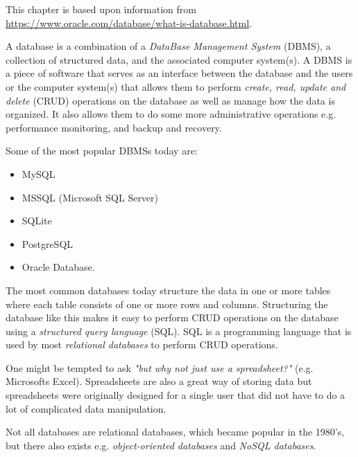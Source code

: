 This chapter is based upon information from \url{https://www.oracle.com/database/what-is-database.html}.

A database is a combination of a \textit{DataBase Management System} (DBMS), a collection of structured data, and the associated computer system(s).
A DBMS is a piece of software that serves as an interface between the database and the users or the computer system(s) that allows them to perform \textit{create, read, update and delete} (CRUD) operations on the database as well as manage how the data is organized. It also allows them to do some more administrative operations e.g. performance monitoring, and backup and recovery.

Some of the most popular DBMSs today are: 
\begin{itemize}
        \item MySQL
        \item MSSQL (Microsoft SQL Server)
        \item SQLite
        \item PostgreSQL
        \item Oracle Database.
\end{itemize}

The most common databases today structure the data in one or more tables where each table consists of one or more rows and columns. Structuring the database like this makes it easy to perform CRUD operations on the database using a \textit{structured query language} (SQL). SQL is a programming language that is used by most \textit{relational databases} to perform CRUD operations.

One might be tempted to ask \textit{"but why not just use a spreadsheet?"} (e.g. Microsofts Excel). Spreadsheets are also a great way of storing data but spreadsheets were originally designed for a single user that did not have to do a lot of complicated data manipulation.

Not all databases are relational databases, which became popular in the 1980's, but there also exists e.g. \textit{object-oriented databases} and \textit{NoSQL databases}. 
